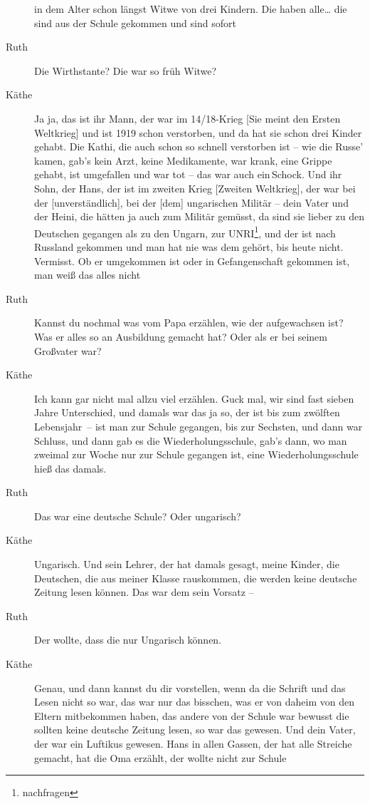 \documentclass[ngerman,]{article}
\begin{document}
\begin{multicols}{2}
\begin{description}
in dem Alter schon längst Witwe von drei Kindern. Die haben alle\ldots{}
die sind aus der Schule gekommen und sind sofort
\item[Ruth]
Die Wirthstante? Die war so früh Witwe?
\item[Käthe]
Ja ja, das ist ihr Mann, der war im 14/18-Krieg {[}Sie meint den Ersten
Weltkrieg{]} und ist 1919 schon verstorben, und da hat sie schon drei
Kinder gehabt. Die Kathi, die auch schon so schnell verstorben ist – wie
die Russe' kamen, gab's kein Arzt, keine Medikamente, war krank, eine
Grippe gehabt, ist umgefallen und war tot – das war auch ein\,Schock.
Und ihr Sohn, der Hans, der ist im zweiten Krieg {[}Zweiten
Weltkrieg{]}, der war bei der {[}unverständlich{]}, bei der {[}dem{]}
ungarischen Militär – dein Vater und der Heini, die hätten ja auch zum
Militär gemüsst, da sind sie lieber zu den Deutschen gegangen als zu den
Ungarn, zur UNRI\footnote{nachfragen}, und der ist nach Russland
gekommen und man hat nie was dem gehört, bis heute nicht. Vermisst. Ob
er umgekommen ist oder in Gefangenschaft gekommen ist, man weiß das
alles nicht
\item[Ruth]
Kannst du nochmal was vom Papa erzählen, wie der aufgewachsen ist? Was
er alles so an Ausbildung gemacht hat? Oder als er bei seinem Großvater
war?
\item[Käthe]
Ich kann gar nicht mal allzu viel erzählen. Guck mal, wir sind fast
sieben Jahre Unterschied, und damals war das ja so, der ist bis zum
zwölften Lebensjahr~– ist man zur Schule gegangen, bis zur Sechsten, und
dann war Schluss, und dann gab es die Wiederholungsschule, gab's dann,
wo man zweimal zur Woche nur zur Schule gegangen ist, eine
Wiederholungsschule hieß das damals.
\item[Ruth]
Das war eine deutsche Schule? Oder ungarisch?
\item[Käthe]
Ungarisch. Und sein Lehrer, der hat damals gesagt, meine Kinder, die
Deutschen, die aus meiner Klasse rauskommen, die werden keine deutsche
Zeitung lesen können. Das war dem sein Vorsatz –
\item[Ruth]
Der wollte, dass die nur Ungarisch können.
\item[Käthe]
Genau, und dann kannst du dir vorstellen, wenn da die Schrift und das
Lesen nicht so war, das war nur das bisschen, was er von daheim von
den\,Eltern mitbekommen haben, das andere von der Schule war bewusst die
sollten keine deutsche Zeitung lesen, so war das gewesen. Und dein
Vater, der war ein Luftikus gewesen. Hans in allen Gassen, der hat alle
Streiche gemacht, hat die Oma erzählt, der wollte nicht zur Schule

\end{description}
\end{multicols}
\end{document}
